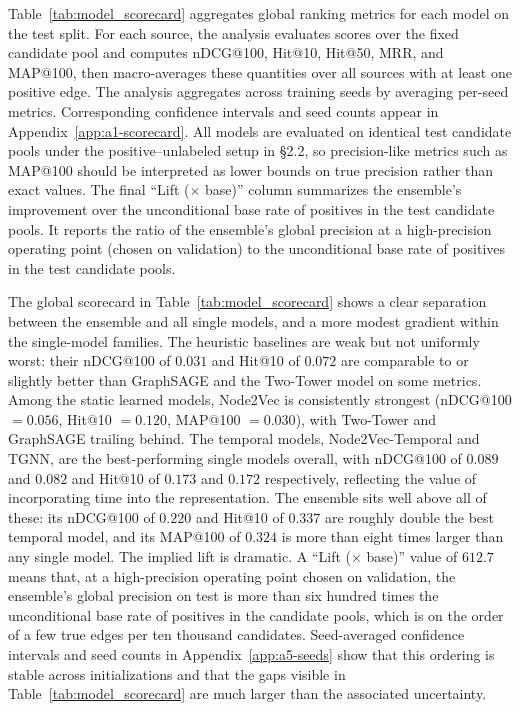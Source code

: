 Table~\ref{tab:model_scorecard} aggregates global ranking metrics for each model on the test split. For each source, the analysis evaluates scores over the fixed candidate pool and computes nDCG@100, Hit@10, Hit@50, MRR, and MAP@100, then macro-averages these quantities over all sources with at least one positive edge. The analysis aggregates across training seeds by averaging per-seed metrics. Corresponding confidence intervals and seed counts appear in Appendix~\ref{app:a1-scorecard}. All models are evaluated on identical test candidate pools under the positive--unlabeled setup in \S2.2, so precision-like metrics such as MAP@100 should be interpreted as lower bounds on true precision rather than exact values. The final ``Lift ($\times$ base)'' column summarizes the ensemble's improvement over the unconditional base rate of positives in the test candidate pools. It reports the ratio of the ensemble's global precision at a high-precision operating point (chosen on validation) to the unconditional base rate of positives in the test candidate pools.

The global scorecard in Table~\ref{tab:model_scorecard} shows a clear separation between the ensemble and all single models, and a more modest gradient within the single-model families. The heuristic baselines are weak but not uniformly worst: their nDCG@100 of \(0.031\) and Hit@10 of \(0.072\) are comparable to or slightly better than GraphSAGE and the Two-Tower model on some metrics. Among the static learned models, Node2Vec is consistently strongest (nDCG@100 \(= 0.056\), Hit@10 \(= 0.120\), MAP@100 \(= 0.030\)), with Two-Tower and GraphSAGE trailing behind. The temporal models, Node2Vec-Temporal and TGNN, are the best-performing single models overall, with nDCG@100 of \(0.089\) and \(0.082\) and Hit@10 of \(0.173\) and \(0.172\) respectively, reflecting the value of incorporating time into the representation. The ensemble sits well above all of these: its nDCG@100 of \(0.220\) and Hit@10 of \(0.337\) are roughly double the best temporal model, and its MAP@100 of \(0.324\) is more than eight times larger than any single model. The implied lift is dramatic. A ``Lift ($\times$ base)'' value of \(612.7\) means that, at a high-precision operating point chosen on validation, the ensemble's global precision on test is more than six hundred times the unconditional base rate of positives in the candidate pools, which is on the order of a few true edges per ten thousand candidates. Seed-averaged confidence intervals and seed counts in Appendix~\ref{app:a5-seeds} show that this ordering is stable across initializations and that the gaps visible in Table~\ref{tab:model_scorecard} are much larger than the associated uncertainty.

